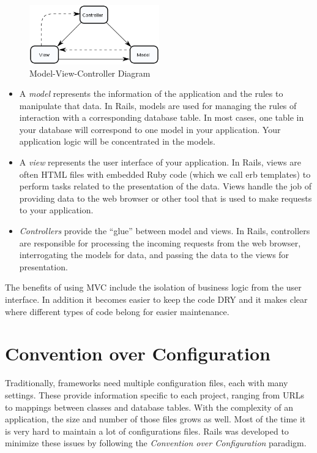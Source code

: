 \begin{figure}[h!]
  \caption{Model-View-Controller Diagram}
  \centering
  \includegraphics[width=0.5\textwidth]{Images/ModelViewController}
\end{figure}

\begin{itemize}
\item A \emph{model} represents the information of the application and the rules to manipulate that data. In Rails, models are used for managing the rules of interaction with a corresponding database table. In most cases, one table in your database will correspond to one model in your application. Your application logic will be concentrated in the models.
\item A \emph{view} represents the user interface of your application. In Rails, views are often HTML files with embedded Ruby code (which we call erb templates) to perform tasks related to the presentation of the data. Views handle the job of providing data to the web browser or other tool that is used to make requests to your application.
\item \emph{Controllers} provide the “glue” between model and views. In Rails, controllers are responsible for processing the incoming requests from the web browser, interrogating the models for data, and passing the data to the views for presentation.
\end{itemize}

The benefits of using MVC include the isolation of business logic from the user interface.
In addition it becomes easier to keep the code DRY and 
it makes clear where different types of code belong for easier maintenance.



\section{Convention over Configuration} 
Traditionally, frameworks need multiple configuration files, each with many settings. 
These provide information specific to each project, ranging from URLs to mappings between classes and database tables. 
With the complexity of an application, the size and number of those files grows as well. 
Most of the time it is very hard to maintain a lot of configurations files. 
Rails was developed to minimize these issues by following the \emph{Convention over Configuration} paradigm.

